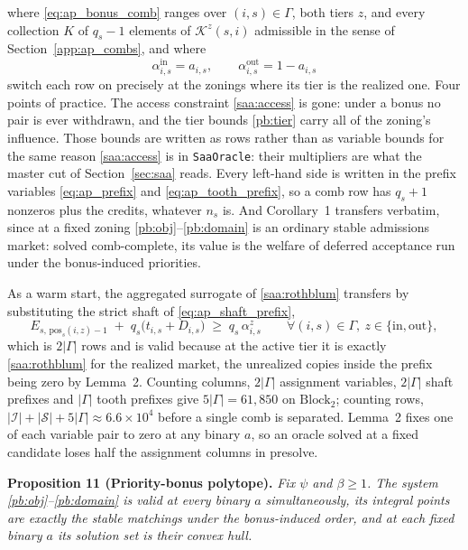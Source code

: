 \documentclass{article}
\begin{document}
where \eqref{eq:ap_bonus_comb} ranges over $(i,s) \in \Gamma$, both tiers $z$, and every collection $K$ of $q_s - 1$ elements of $\mathcal{K}^{z}(s,i)$ admissible in the sense of Section~\ref{app:ap_combs}, and where
\begin{equation}\label{eq:ap_alpha}
\alpha^{\mathrm{in}}_{i,s} = a_{i,s},
\qquad
\alpha^{\mathrm{out}}_{i,s} = 1 - a_{i,s}
\end{equation}
switch each row on precisely at the zonings where its tier is the realized one. Four points of practice. The access constraint \eqref{saa:access} is gone: under a bonus no pair is ever withdrawn, and the tier bounds \eqref{pb:tier} carry all of the zoning's influence. Those bounds are written as rows rather than as variable bounds for the same reason \eqref{saa:access} is in \texttt{SaaOracle}: their multipliers are what the master cut of Section~\ref{sec:saa} reads. Every left-hand side is written in the prefix variables \eqref{eq:ap_prefix} and \eqref{eq:ap_tooth_prefix}, so a comb row has $q_s + 1$ nonzeros plus the credits, whatever $n_s$ is. And Corollary~1 transfers verbatim, since at a fixed zoning \eqref{pb:obj}--\eqref{pb:domain} is an ordinary stable admissions market: solved comb-complete, its value is the welfare of deferred acceptance run under the bonus-induced priorities.

As a warm start, the aggregated surrogate of \eqref{saa:rothblum} transfers by substituting the strict shaft of \eqref{eq:ap_shaft_prefix},
\begin{equation}\label{pb:rothblum}
E_{s,\, \mathrm{pos}_s(i,z) - 1}
\;+\; q_s \big( t_{i,s} + D_{i,s} \big)
\;\ge\; q_s\, \alpha^{z}_{i,s}
\qquad \forall (i,s) \in \Gamma, \ z \in \{\mathrm{in}, \mathrm{out}\},
\end{equation}
which is $2|\Gamma|$ rows and is valid because at the active tier it is exactly \eqref{saa:rothblum} for the realized market, the unrealized copies inside the prefix being zero by Lemma~2. Counting columns, $2|\Gamma|$ assignment variables, $2|\Gamma|$ shaft prefixes and $|\Gamma|$ tooth prefixes give $5|\Gamma| = 61{,}850$ on $\text{Block}_2$; counting rows, $|\mathcal{I}| + |\mathcal{S}| + 5|\Gamma| \approx 6.6 \times 10^4$ before a single comb is separated. Lemma~2 fixes one of each variable pair to zero at any binary $a$, so an oracle solved at a fixed candidate loses half the assignment columns in presolve.

\noindent\textbf{Proposition 11 (Priority-bonus polytope).} \textit{Fix $\psi$ and $\beta \ge 1$. The system \eqref{pb:obj}--\eqref{pb:domain} is valid at every binary $a$ simultaneously, its integral points are exactly the stable matchings under the bonus-induced order, and at each fixed binary $a$ its solution set is their convex hull.}
\end{document}
